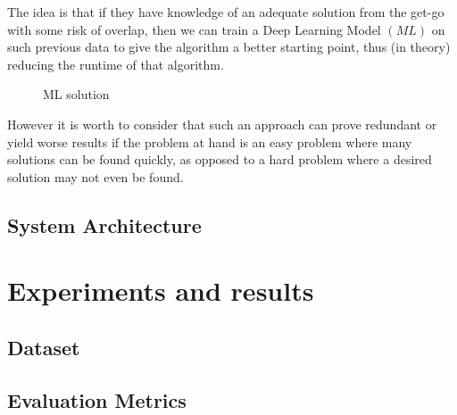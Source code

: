 \documentclass[12pt,a4paper]{report}
\begin{document}
The idea is that if they have knowledge of an adequate solution from the get-go with some risk of overlap, then we can train a Deep Learning Model $(M\!L)$ on such previous data to give the algorithm a better starting point, thus (in theory) reducing the runtime of that algorithm.

\begin{figure}[ht]
    \centering
    \caption{ML solution}
    \label{fig:ml_solution}
\end{figure}

However it is worth to consider that such an approach can prove redundant or yield worse results if the problem at hand is an easy problem where many solutions can be found quickly, as opposed to a hard problem where a desired solution may not even be found. 

\section{System Architecture}

\chapter{Experiments and results}
\section{Dataset}
\section{Evaluation Metrics}
\end{document}

